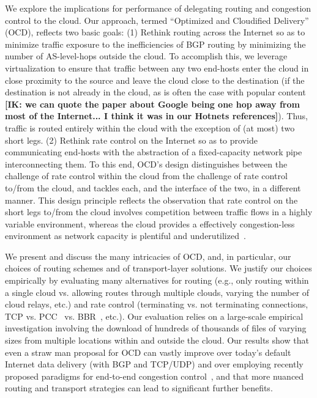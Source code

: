 \documentclass[10pt,sigconf]{acmart}
\newcommand{\mycomm}[3]{{\color{#2} \textbf{[#1: #3]}}}
\newcommand{\mycomm}[3]{}
\newcommand{\IK}[1]{\mycomm{IK}{blue}{#1}}
\begin{document}
We explore the implications for performance of delegating routing and congestion control to the cloud. Our approach, termed ``Optimized and Cloudified Delivery'' (OCD), reflects two basic goals: (1) Rethink routing across the Internet so as to minimize traffic exposure to the inefficiencies of BGP routing by minimizing the number of AS-level-hops outside the cloud. To accomplish this, we leverage virtualization to ensure that traffic between any two end-hosts enter the cloud in close proximity to the source and leave the cloud close to the destination (if the destination is not already in the cloud, as is often the case with popular content\IK{we can quote the paper about Google being one hop away from most of the Internet... I think it was in our Hotnets references}). Thus, traffic is routed entirely within the cloud with the exception of (at most) two short legs. (2) Rethink rate control on the Internet so as to provide communicating end-hosts with the abstraction of a fixed-capacity network pipe interconnecting them. To this end, OCD's design distinguishes between the challenge of rate control within the cloud from the challenge of rate control to/from the cloud, and tackles each, and the interface of the two, in a different manner. This design principle reflects the observation that rate control on the short legs to/from the cloud involves competition between traffic flows in a highly variable environment, whereas the cloud provides a effectively congestion-less environment as network capacity is plentiful and underutilized~\cite{x,y}.

We present and discuss the many intricacies of OCD, and, in particular, our choices of routing schemes and of transport-layer solutions. We justify our choices empirically by evaluating many alternatives for routing (e.g., only routing within a single cloud vs. allowing routes through multiple clouds, varying the number of cloud relays, etc.) and rate control (terminating vs. not terminating connections, TCP vs. PCC~\cite{PCC} vs. BBR~\cite{BBR}, etc.). Our evaluation relies on a large-scale empirical investigation involving the download of hundreds of thousands of files of varying sizes from multiple locations within and outside the cloud. Our results show that even a straw man proposal for OCD can vastly improve over today's default Internet data delivery (with BGP and TCP/UDP) and over employing recently proposed paradigms for end-to-end congestion control~\cite{x,y}, and that more nuanced routing and transport strategies can lead to significant further benefits.
\end{document}

